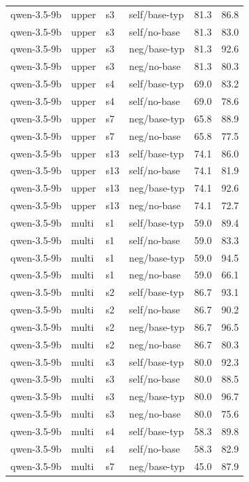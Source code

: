 {\begin{longtable}{llll rr}
qwen-3.5-9b & upper & s3 & self/base-typ & 81.3 & 86.8 \\
qwen-3.5-9b & upper & s3 & self/no-base & 81.3 & 83.0 \\
qwen-3.5-9b & upper & s3 & neg/base-typ & 81.3 & 92.6 \\
qwen-3.5-9b & upper & s3 & neg/no-base & 81.3 & 80.3 \\
qwen-3.5-9b & upper & s4 & self/base-typ & 69.0 & 83.2 \\
qwen-3.5-9b & upper & s4 & self/no-base & 69.0 & 78.6 \\
qwen-3.5-9b & upper & s7 & neg/base-typ & 65.8 & 88.9 \\
qwen-3.5-9b & upper & s7 & neg/no-base & 65.8 & 77.5 \\
qwen-3.5-9b & upper & s13 & self/base-typ & 74.1 & 86.0 \\
qwen-3.5-9b & upper & s13 & self/no-base & 74.1 & 81.9 \\
qwen-3.5-9b & upper & s13 & neg/base-typ & 74.1 & 92.6 \\
qwen-3.5-9b & upper & s13 & neg/no-base & 74.1 & 72.7 \\
\midrule
qwen-3.5-9b & multi & s1 & self/base-typ & 59.0 & 89.4 \\
qwen-3.5-9b & multi & s1 & self/no-base & 59.0 & 83.3 \\
qwen-3.5-9b & multi & s1 & neg/base-typ & 59.0 & 94.5 \\
qwen-3.5-9b & multi & s1 & neg/no-base & 59.0 & 66.1 \\
qwen-3.5-9b & multi & s2 & self/base-typ & 86.7 & 93.1 \\
qwen-3.5-9b & multi & s2 & self/no-base & 86.7 & 90.2 \\
qwen-3.5-9b & multi & s2 & neg/base-typ & 86.7 & 96.5 \\
qwen-3.5-9b & multi & s2 & neg/no-base & 86.7 & 80.3 \\
qwen-3.5-9b & multi & s3 & self/base-typ & 80.0 & 92.3 \\
qwen-3.5-9b & multi & s3 & self/no-base & 80.0 & 88.5 \\
qwen-3.5-9b & multi & s3 & neg/base-typ & 80.0 & 96.7 \\
qwen-3.5-9b & multi & s3 & neg/no-base & 80.0 & 75.6 \\
qwen-3.5-9b & multi & s4 & self/base-typ & 58.3 & 89.8 \\
qwen-3.5-9b & multi & s4 & self/no-base & 58.3 & 82.9 \\
qwen-3.5-9b & multi & s7 & neg/base-typ & 45.0 & 87.9 \\

\end{longtable}}
